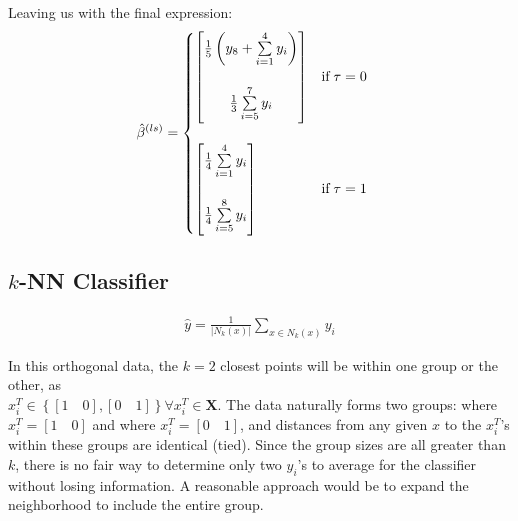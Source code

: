 \documentclass[a4paper]{article}
\begin{document}
Leaving us with the final expression:
\begin{align*}
\hat{\beta}^{(ls)} &=
  \begin{cases}
    \begin{bmatrix}
      \frac{1}{5}\left(y_8+\sum\limits_{i=1}^4 y_i\right)\\\\
      \frac{1}{3}\sum\limits_{i=5}^7 y_i\vspace{2pt}\\
    \end{bmatrix} & \text{if}\; \tau = 0\\\\
    \begin{bmatrix}
      \frac{1}{4}\sum\limits_{i=1}^4 y_i\\\\
      \frac{1}{4}\sum\limits_{i=5}^8 y_i\vspace{2pt}\\
    \end{bmatrix} & \text{if}\; \tau=1\\
  \end{cases}
\end{align*}

\subsection{$k$-NN Classifier}
\begin{align*}
  \hat{y} = \frac{1}{\left|N_k(x)\right|} \sum\limits_{x \in N_k(x)}y_i
\end{align*}

In this orthogonal data, the $k=2$ closest points will be within one group or the
other, as\\ $x_i^T \in \left\{[1 \quad 0],  [0 \quad 1]\right\}
\forall x_i^T \in \mathbf{X}$. The data naturally forms two groups: where $x_i^T=[1 \quad
0]$ and where $x_i^T=[0 \quad 1]$, and distances from any given $x$ to the
$x_i^T$'s within these groups are 
identical (tied).  Since the group sizes are all 
greater than $k$, there is no fair way to determine
only two $y_i$'s to average for the classifier without losing
information.  A reasonable approach would be to expand the
neighborhood to include the entire group.\\  
\end{document}
